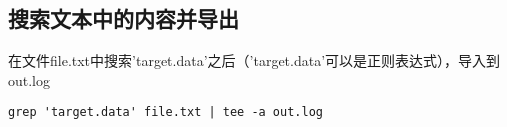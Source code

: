 \documentclass[a4paper,12pt]{ctexart}
\begin{document}
\subsection{搜索文本中的内容并导出}
在文件file.txt中搜索'target.data'之后（'target.data'可以是正则表达式），导入到out.log
\begin{verbatim}
grep 'target.data' file.txt | tee -a out.log
\end{verbatim}




%
%

%
\end{document}
